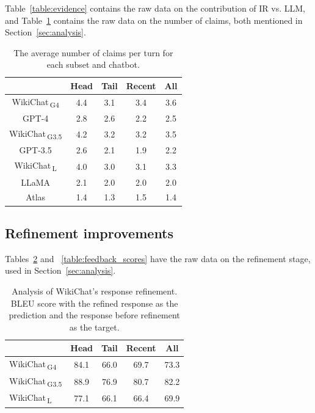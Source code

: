 \documentclass[11pt]{article}
\newcommand{\system}[0]{WikiChat\xspace}
\newcommand{\systemgt}[0]{WikiChat$\,$\textsubscript{G3.5}\xspace}
\newcommand{\systemgf}[0]{WikiChat$\,$\textsubscript{G4}\xspace}
\newcommand{\systeml}[0]{WikiChat$\,$\textsubscript{L}\xspace}
\begin{document}
Table~\ref{table:evidence} contains the raw data on the contribution of IR vs. LLM, and 
Table~\ref{table:dataset_claims} contains the raw data on the number of claims, both mentioned in Section~\ref{sec:analysis}.
\begin{table}[ht]
\centering
\begin{tabular}{c c c c c}
 \hline
          & Head & Tail & Recent & All \\
 \hline
\systemgf & 4.4 & 3.1 & 3.4 & 3.6 \\
GPT-4     & 2.8 & 2.6 & 2.2 & 2.5 \\
\systemgt & 4.2 & 3.2 & 3.2 & 3.5 \\
GPT-3.5   & 2.6 & 2.1 & 1.9 & 2.2 \\
\systeml  & 4.0 & 3.0 & 3.1 & 3.3 \\
LLaMA     & 2.1 & 2.0 & 2.0 & 2.0 \\
Atlas     & 1.4 & 1.3 & 1.5 & 1.4 \\
 \hline
\end{tabular}
\caption{The average number of claims per turn for each subset and chatbot.}
\label{table:dataset_claims}
\end{table}


\subsection{Refinement improvements}
Tables~\ref{table:refine_bleu} and ~\ref{table:feedback_scores} have the raw data on the refinement stage, used in Section~\ref{sec:analysis}.
\begin{table}[ht]
\centering
\begin{tabular}{l c c c c} 
 \hline
& Head & Tail & Recent & All \\
 \hline
\systemgf & 84.1 & 66.0 & 69.7 & 73.3 \\
\systemgt & 88.9 & 76.9 & 80.7 & 82.2 \\
\systeml & 77.1 & 66.1 & 66.4 & 69.9 \\
 \hline
\end{tabular}
\caption{Analysis of \system's response refinement. BLEU score with the refined response as the prediction and the response before refinement as the target.}
\label{table:refine_bleu}
\end{table}
\end{document}

